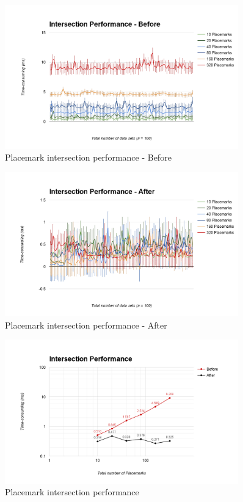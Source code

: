 \begin{figure}[H]
	\caption{Placemark intersection performance - Before}
	\label{fig:placemark-intersection-performance-before}
	\centering
	\includegraphics[width=0.9\textwidth, keepaspectratio]{Figures/placemark-intersection-performance-before.png}
	\decoRule
\end{figure}

\begin{figure}[H]
	\caption{Placemark intersection performance - After}
	\label{fig:placemark-intersection-performance-after}
	\centering
	\includegraphics[width=0.9\textwidth, keepaspectratio]{Figures/placemark-intersection-performance-after.png}
	\decoRule
\end{figure}

\begin{figure}[H]
	\caption{Placemark intersection performance}
	\label{fig:placemark-intersection-performance}
	\centering
	\includegraphics[width=0.9\textwidth, keepaspectratio]{Figures/placemark-intersection-performance.png}
	\decoRule
\end{figure}

